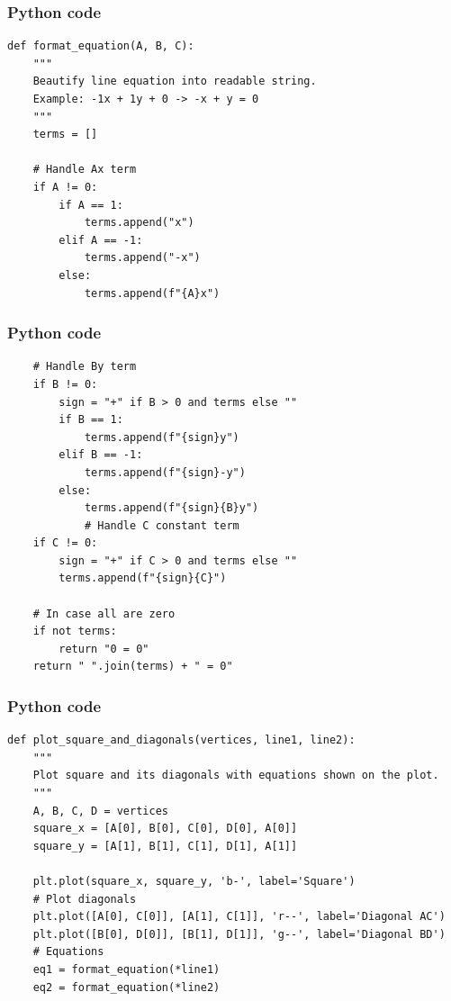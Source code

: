 \documentclass{beamer}
\begin{document}
\begin{frame}[fragile]
    \frametitle{Python code}

    \begin{lstlisting}
def format_equation(A, B, C):
    """
    Beautify line equation into readable string.
    Example: -1x + 1y + 0 -> -x + y = 0
    """
    terms = []

    # Handle Ax term
    if A != 0:
        if A == 1:
            terms.append("x")
        elif A == -1:
            terms.append("-x")
        else:
            terms.append(f"{A}x")

    \end{lstlisting}
\end{frame}

\begin{frame}[fragile]
    \frametitle{Python code}

    \begin{lstlisting}
    # Handle By term
    if B != 0:
        sign = "+" if B > 0 and terms else ""
        if B == 1:
            terms.append(f"{sign}y")
        elif B == -1:
            terms.append(f"{sign}-y")
        else:
            terms.append(f"{sign}{B}y")
            # Handle C constant term
    if C != 0:
        sign = "+" if C > 0 and terms else ""
        terms.append(f"{sign}{C}")

    # In case all are zero
    if not terms:
        return "0 = 0"
    return " ".join(terms) + " = 0"
    \end{lstlisting}
\end{frame}


\begin{frame}[fragile]
    \frametitle{Python code}

    \begin{lstlisting}
def plot_square_and_diagonals(vertices, line1, line2):
    """
    Plot square and its diagonals with equations shown on the plot.
    """
    A, B, C, D = vertices
    square_x = [A[0], B[0], C[0], D[0], A[0]]
    square_y = [A[1], B[1], C[1], D[1], A[1]]
    
    plt.plot(square_x, square_y, 'b-', label='Square') 
    # Plot diagonals
    plt.plot([A[0], C[0]], [A[1], C[1]], 'r--', label='Diagonal AC')
    plt.plot([B[0], D[0]], [B[1], D[1]], 'g--', label='Diagonal BD')
    # Equations
    eq1 = format_equation(*line1)
    eq2 = format_equation(*line2)
    \end{lstlisting}
\end{frame}
\end{document}
